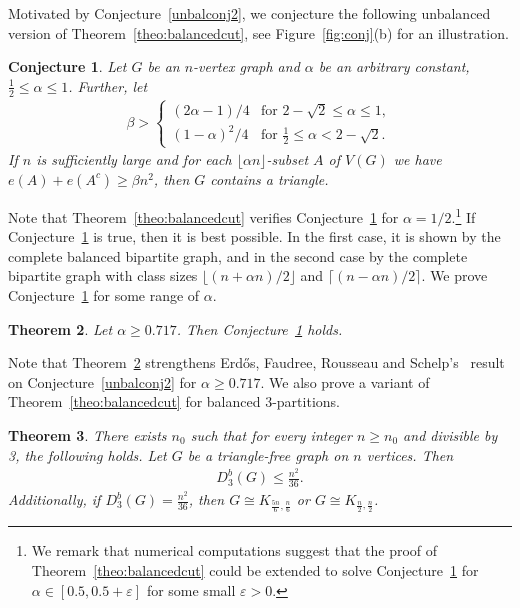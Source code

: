 \documentclass[11pt]{article}
\newtheorem{theo}{Theorem}
\newtheorem{conj}[theo]{Conjecture}
\theoremstyle{definition}
\numberwithin{theo}{section}
\begin{document}
Motivated by Conjecture~\ref{unbalconj2}, we conjecture the following unbalanced version of Theorem~\ref{theo:balancedcut},
 see Figure~\ref{fig:conj}(b) for an illustration.
\begin{conj}
\label{unbalconj}
Let $G$ be an $n$-vertex graph and $\alpha$ be an arbitrary constant, $\frac{1}{2}\leq\alpha\leq1$. Further, let
\begin{align*}
    \beta> \begin{cases}
        (2\alpha-1)/4& \text{for } 2-\sqrt{2}\leq \alpha \leq 1, \\
    (1-\alpha)^2/4 & \text{for }\frac{1}{2}\leq \alpha< 2-\sqrt{2}. 
    \end{cases}
\end{align*}
If $n$ is sufficiently large and for each $\lfloor \alpha n\rfloor$-subset $A$ of $V(G)$ 
we have $e(A)+e(A^c)\geq \beta n^2$, then $G$ contains a triangle. 
\end{conj}
Note that Theorem~\ref{theo:balancedcut} verifies Conjecture~\ref{unbalconj} for $\alpha=1/2$.\footnote{We remark that numerical computations suggest that the proof of  Theorem~\ref{theo:balancedcut} could be extended to solve Conjecture~\ref{unbalconj} for $\alpha\in[0.5,0.5+\varepsilon]$ for some small $\varepsilon>0$.} If Conjecture~\ref{unbalconj} is true, then it is best possible. In the first case, it is shown by the complete balanced bipartite graph, and in the second case by the complete bipartite graph with class sizes $\lfloor(n+\alpha n)/2\rfloor$ and $\lceil(n-\alpha n)/2\rceil$. We prove Conjecture~\ref{unbalconj} for some range of $\alpha$. 
\begin{theo}
\label{unbaltheo}
Let $\alpha \geq 0.717$. Then 
Conjecture~\ref{unbalconj}
holds.
\end{theo}
 Note that Theorem~\ref{unbaltheo} strengthens Erd\H{o}s, Faudree, Rousseau and Schelp's~\cite{MR1273598} result on Conjecture~\ref{unbalconj2} for $\alpha \geq 0.717$. We also prove a variant of Theorem~\ref{theo:balancedcut} for balanced $3$-partitions. 
\begin{theo}
\label{theo:baltri}
There exists $n_0$ such that for every integer $n\geq n_0$ and divisible by 3, the following holds. Let $G$ be a triangle-free graph on $n$ vertices. Then 
\begin{align*}
    D_3^b(G)\leq \frac{n^2}{36}.
\end{align*}
Additionally, if $D_3^b(G)=\frac{n^2}{36}$, then $G\cong K_{\frac{5n}{6},\frac{n}{6}}$ or $G\cong K_{\frac{n}{2},\frac{n}{2}}$. 
\end{theo}
\end{document}
